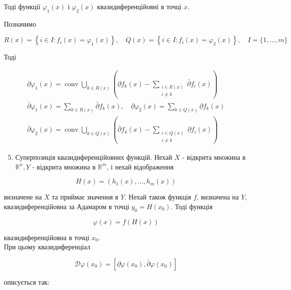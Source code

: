\documentclass[10pt]{article}
\begin{document}
Тоді функції $\varphi_{1}(x)$ і $\varphi_{2}(x)$ квазидиференційовні в точці $x$.

Позначимо

$$
R(x)=\left\{i \in I: f_{i}(x)=\varphi_{1}(x)\right\}, \quad Q(x)=\left\{i \in I: f_{i}(x)=\varphi_{2}(x)\right\}, \quad I=\{1, \ldots, m\}
$$

Тоді

$$
\begin{gathered}
\underline{\partial} \varphi_{1}(x)=\operatorname{conv} \bigcup_{k \in R(x)}\left(\underline{\partial} f_{k}(x)-\sum_{\substack{i \in R(x) \\
i \neq k}} \bar{\partial} f_{i}(x)\right) \\
\bar{\partial} \varphi_{1}(x)=\sum_{k \in R(x)} \bar{\partial} f_{k}(x), \quad \underline{\partial} \varphi_{2}(x)=\sum_{k \in Q(x)} \underline{\partial} f_{k}(x) \\
\bar{\partial} \varphi_{2}(x)=\operatorname{conv} \bigcup_{k \in Q(x)}\left(\bar{\partial} f_{k}(x)-\sum_{\substack{i \in Q(x) \\
i \neq k}} \underline{\partial} f_{i}(x)\right)
\end{gathered}
$$

\begin{enumerate}
  \setcounter{enumi}{4}
  \item Суперпозиція квазидиференційовних функцій. Нехай $X$ - відкрита множина в $\mathbb{R}^{n}, Y$ - відкрита множина в $\mathbb{R}^{m}$, і нехай відображення
\end{enumerate}

$$
H(x)=\left(h_{1}(x), \ldots, h_{m}(x)\right)
$$

визначене на $X$ та приймає значення в $Y$. Нехай також функція $f$, визначена на $Y$, квазидиференційовна за Адамаром в точці $y_{0}=H\left(x_{0}\right)$. Тоді функція

$$
\varphi(x)=f(H(x))
$$

квазидиференційовна в точці $x_{0}$.\\
При цьому квазидиференціал

$$
\mathcal{D} \varphi\left(x_{0}\right)=\left[\underline{\partial} \varphi\left(x_{0}\right), \bar{\partial} \varphi\left(x_{0}\right)\right]
$$

описується так:
\end{document}
